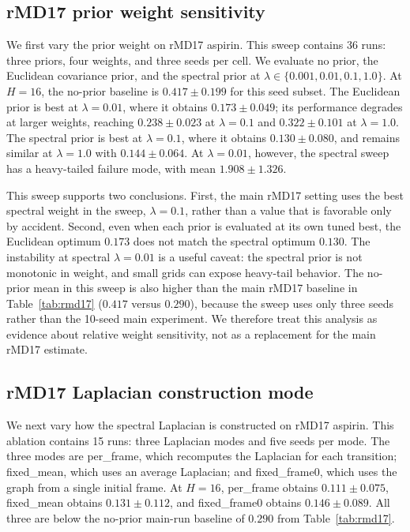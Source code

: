 \subsection{rMD17 prior weight sensitivity}\label{sec:weight_sweep}

We first vary the prior weight on rMD17 aspirin. This sweep contains 36 runs: three priors, four weights, and three seeds per cell. We evaluate no prior, the Euclidean covariance prior, and the spectral prior at \(\lambda \in \{0.001,0.01,0.1,1.0\}\). At \(H=16\), the no-prior baseline is \(0.417 \pm 0.199\) for this seed subset. The Euclidean prior is best at \(\lambda=0.01\), where it obtains \(0.173 \pm 0.049\); its performance degrades at larger weights, reaching \(0.238 \pm 0.023\) at \(\lambda=0.1\) and \(0.322 \pm 0.101\) at \(\lambda=1.0\). The spectral prior is best at \(\lambda=0.1\), where it obtains \(0.130 \pm 0.080\), and remains similar at \(\lambda=1.0\) with \(0.144 \pm 0.064\). At \(\lambda=0.01\), however, the spectral sweep has a heavy-tailed failure mode, with mean \(1.908 \pm 1.326\).

This sweep supports two conclusions. First, the main rMD17 setting uses the best spectral weight in the sweep, \(\lambda=0.1\), rather than a value that is favorable only by accident. Second, even when each prior is evaluated at its own tuned best, the Euclidean optimum \(0.173\) does not match the spectral optimum \(0.130\). The instability at spectral \(\lambda=0.01\) is a useful caveat: the spectral prior is not monotonic in weight, and small grids can expose heavy-tail behavior. The no-prior mean in this sweep is also higher than the main rMD17 baseline in Table~\ref{tab:rmd17} (\(0.417\) versus \(0.290\)), because the sweep uses only three seeds rather than the 10-seed main experiment. We therefore treat this analysis as evidence about relative weight sensitivity, not as a replacement for the main rMD17 estimate.

\subsection{rMD17 Laplacian construction mode}\label{sec:rmd17_lapmode}

We next vary how the spectral Laplacian is constructed on rMD17 aspirin. This ablation contains 15 runs: three Laplacian modes and five seeds per mode. The three modes are per\_frame, which recomputes the Laplacian for each transition; fixed\_mean, which uses an average Laplacian; and fixed\_frame0, which uses the graph from a single initial frame. At \(H=16\), per\_frame obtains \(0.111 \pm 0.075\), fixed\_mean obtains \(0.131 \pm 0.112\), and fixed\_frame0 obtains \(0.146 \pm 0.089\). All three are below the no-prior main-run baseline of \(0.290\) from Table~\ref{tab:rmd17}.

